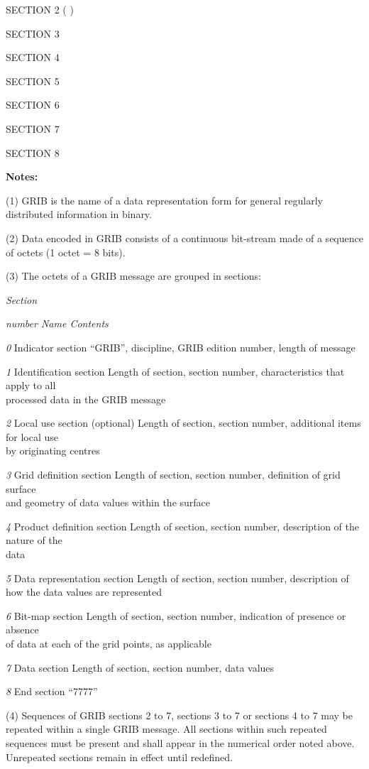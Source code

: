 SECTION 2 ( )

SECTION 3

SECTION 4

SECTION 5

SECTION 6

SECTION 7

SECTION 8

\textbf{Notes:}

(1) GRIB is the name of a data representation form for general regularly distributed information in binary.

(2) Data encoded in GRIB consists of a continuous bit-stream made of a sequence of octets (1 octet = 8 bits).

(3) The octets of a GRIB message are grouped in sections:

\emph{Section}

\emph{number Name Contents}

\emph{0} Indicator section ``GRIB'', discipline, GRIB edition number, length of message

\emph{1} Identification section Length of section, section number, characteristics that apply to all\\
processed data in the GRIB message

\emph{2} Local use section (optional) Length of section, section number, additional items for local use\\
by originating centres

\emph{3} Grid definition section Length of section, section number, definition of grid surface\\
and geometry of data values within the surface

\emph{4} Product definition section Length of section, section number, description of the nature of the\\
data

\emph{5} Data representation section Length of section, section number, description of how the data values are represented

\emph{6} Bit-map section Length of section, section number, indication of presence or absence\\
of data at each of the grid points, as applicable

\emph{7} Data section Length of section, section number, data values

\emph{8} End section ``7777''

(4) Sequences of GRIB sections 2 to 7, sections 3 to 7 or sections 4 to 7 may be repeated within a single GRIB message. All sections within such repeated sequences must be present and shall appear in the numerical order noted above. Unrepeated sections remain in effect until redefined.

